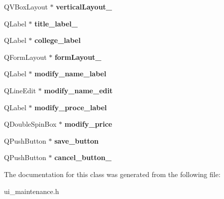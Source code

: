 \begin{DoxyCompactItemize}
Q\+V\+Box\+Layout $\ast$ {\bfseries vertical\+Layout\+\_}
\item 
\mbox{\label{class_ui__maintenance_a67cf113a3f95dfc4d5280e4147fbb625}} 
Q\+Label $\ast$ {\bfseries title\+\_\+label\+\_}
\item 
\mbox{\label{class_ui__maintenance_a0cf529a4895a6782ef72b3d1fddff5ed}} 
Q\+Label $\ast$ {\bfseries college\+\_\+label}
\item 
\mbox{\label{class_ui__maintenance_a6ba302c4977de89f9ee4eb956b5b0e66}} 
Q\+Form\+Layout $\ast$ {\bfseries form\+Layout\+\_}
\item 
\mbox{\label{class_ui__maintenance_a16fe87760af0f686e3a5839ec4692e54}} 
Q\+Label $\ast$ {\bfseries modify\+\_\+name\+\_\+label}
\item 
\mbox{\label{class_ui__maintenance_a16147e8bd5dddf79f45ffbeb8513eade}} 
Q\+Line\+Edit $\ast$ {\bfseries modify\+\_\+name\+\_\+edit}
\item 
\mbox{\label{class_ui__maintenance_a63501e105caa239b4babd8ace8b4e917}} 
Q\+Label $\ast$ {\bfseries modify\+\_\+proce\+\_\+label}
\item 
\mbox{\label{class_ui__maintenance_aedabbc3ab5a8417364b9b4840f1e01db}} 
Q\+Double\+Spin\+Box $\ast$ {\bfseries modify\+\_\+price}
\item 
\mbox{\label{class_ui__maintenance_ab8fbf055de90a7e6257f4699300749e8}} 
Q\+Push\+Button $\ast$ {\bfseries save\+\_\+button}
\item 
\mbox{\label{class_ui__maintenance_a3d0f340ae64b09fad7dc39c19720cfb2}} 
Q\+Push\+Button $\ast$ {\bfseries cancel\+\_\+button\+\_}
\end{DoxyCompactItemize}


The documentation for this class was generated from the following file\+:\begin{DoxyCompactItemize}
\item 
ui\+\_\+maintenance.\+h\end{DoxyCompactItemize}
